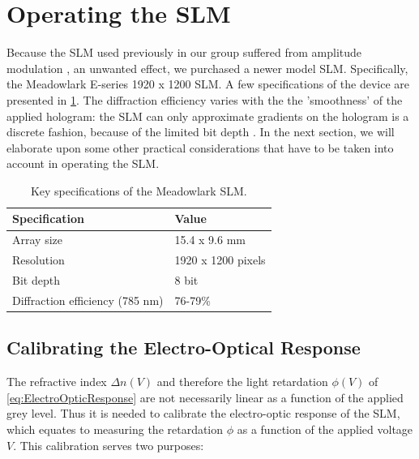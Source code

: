 \section{Operating the SLM}\label{sec:SLMoperatoin}

Because the SLM used previously in our group suffered from amplitude modulation \cite{Bijnen2015,Dijk2012}, an unwanted effect, we purchased a newer model SLM. Specifically, the Meadowlark E-series 1920 x 1200 SLM.
A few specifications of the device are presented in \cref{table:SLMspecs}.
The diffraction efficiency varies with the the 'smoothness' of the applied hologram: the SLM can only approximate gradients on the hologram is a discrete fashion, because of the limited bit depth \cite{Labuhn2016}.
In the next section, we will elaborate upon some other practical considerations that have to be taken into account in operating the SLM.

\begin{table}[h]
    \centering
    \caption{Key specifications of the Meadowlark SLM.}
    \label{table:SLMspecs}
    \begin{tabular}{l | l}
        \textbf{Specification}              & \textbf{Value}        \\ \hline 
        Array size                          & 15.4 x 9.6 mm         \\ \hline
        Resolution                          & 1920 x 1200 pixels    \\ \hline
        Bit depth                           & 8 bit                 \\ \hline
        Diffraction efficiency (785 nm)  & 76-79\%   
    \end{tabular}
\end{table}


\subsection{Calibrating the Electro-Optical Response}

The refractive index $\Delta n(V)$ and therefore the light retardation $\phi(V)$ of \cref{eq:ElectroOpticResponse} are not necessarily linear as a function of the applied grey level.
Thus it is needed to calibrate the electro-optic response of the \ac{SLM}, which equates to measuring the retardation $\phi$ as a function of the applied voltage $V$. 
This calibration serves two purposes:

